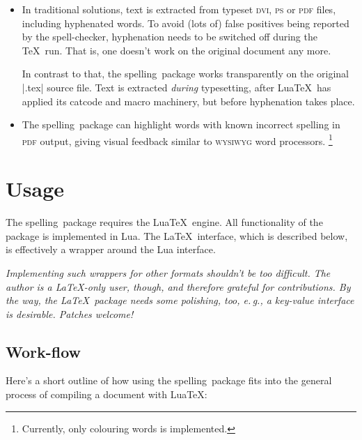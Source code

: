 \documentclass[11pt]{article}
\newcommand*{\pkg}{\textsf{spelling}}
\newcommand*{\acr}[1]{\mbox{\scshape#1}}
\newcommand*{\latinphrase}[1]{\foreignlanguage{latin}{\emph{#1}}}
\newcommand*{\lpeg}{\latinphrase{e.\,g.}\xspace}
\begin{document}
\begin{itemize}

\item In traditional solutions, text is extracted from typeset
  \acr{dvi}, \acr{ps} or \acr{pdf} files, including hyphenated words.
  To avoid (lots of) false positives being reported by the
  spell-checker, hyphenation needs to be switched off during the \TeX\
  run.  That is, one doesn't work on the original document any more.

  In contrast to that, the \pkg\ package works transparently on the
  original |.tex| source file.  Text is extracted \emph{during}
  typesetting, after Lua\TeX\ has applied its catcode and macro
  machinery, but before hyphenation takes place.

\item The \pkg\ package can highlight words with known incorrect
  spelling in \acr{pdf} output, giving visual feedback similar to
  \acr{wysiwyg} word processors.%
  \footnote{Currently, only colouring words is implemented.}

\end{itemize}


\section{Usage}
\label{sec:usage}

The \pkg\ package requires the Lua\TeX\ engine.  All functionality of
the package is implemented in Lua.  The \LaTeX\ interface, which is
described below, is effectively a wrapper around the Lua interface.

\emph{Implementing such wrappers for other formats shouldn't be too
  difficult.  The author is a \LaTeX-only user, though, and therefore
  grateful for contributions.  By the way, the \LaTeX\ package needs
  some polishing, too, \lpeg, a key-value interface is desirable.
  Patches welcome!}


\subsection{Work-flow}
\label{sec:work-flow}

Here's a short outline of how using the \pkg\ package fits into the
general process of compiling a document with Lua\TeX:
\end{document}
